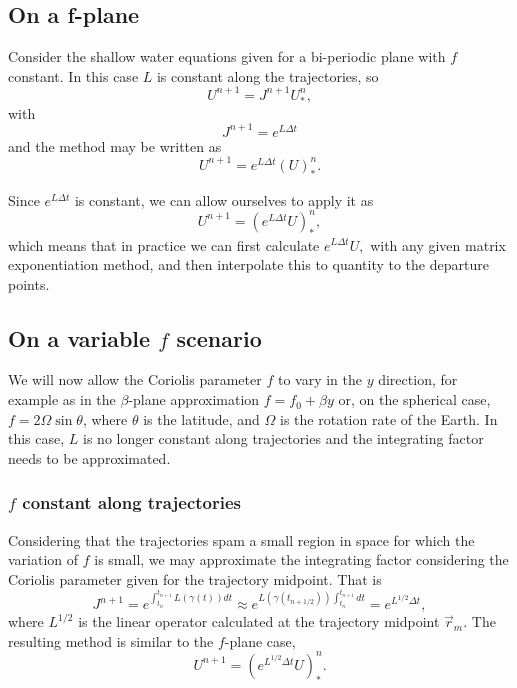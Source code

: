 \documentclass[10pt,a4paper]{article}
\begin{document}
\subsection{On a f-plane} 

Consider the shallow water equations given for a bi-periodic plane with $f$ constant. In this case $L$ is constant along the trajectories, so
\begin{equation}
U^{n+1}=J^{n+1}U^{n}_{*},
\end{equation}
with
\begin{equation}
 J^{n+1}=e^{L\Delta t}
\end{equation}
and the method may be written as
\begin{equation}
U^{n+1}=e^{L\Delta t}(U)^{n}_{*}.
\end{equation}

Since $e^{L\Delta t}$ is constant, we can allow ourselves to apply it as  
\begin{equation}
U^{n+1}=(e^{L\Delta t} U)^{n}_{*},
\end{equation}
which means that in practice we can first calculate 
$
e^{L\Delta t} U,
$
with any given matrix exponentiation method, and then interpolate this to quantity to the departure points.


\subsection{On a variable $f$ scenario}

We will now allow the Coriolis parameter $f$ to vary in the $y$ direction, for example as in the $\beta$-plane approximation $f=f_0+\beta y$ or, on the spherical case, $f=2\Omega \sin \theta$, where $\theta$ is the latitude, and $\Omega$ is the rotation rate of the Earth. In this case, $L$ is no longer constant along trajectories and the integrating factor needs to be approximated. 

\subsubsection{$f$ constant along trajectories}

Considering that the trajectories spam a small region in space for which the variation of $f$ is small, we may approximate the integrating factor considering the Coriolis parameter given for the trajectory midpoint. That is
\begin{equation}
J^{n+1}=e^{\int_{t_n}^{t_{n+1}}L(\gamma(t))dt}  \approx e^{L(\gamma(t_{n+1/2})) \int_{t_n}^{t_{n+1}}dt} = e^{L^{1/2}\Delta t},
\end{equation}
 where $L^{1/2}$ is the linear operator calculated at the trajectory midpoint $\vec{r}_m$. The resulting method is similar to the $f$-plane case,
\begin{equation}
U^{n+1}=(e^{L^{1/2}\Delta t} U)^{n}_{*}.
\end{equation}
 
\end{document}
